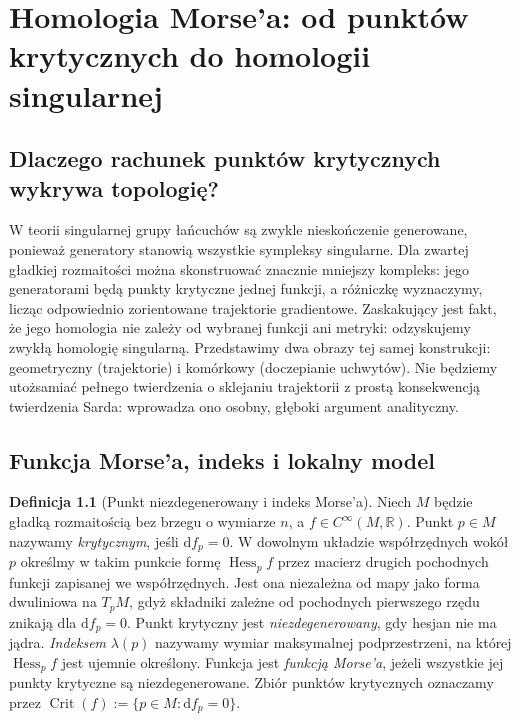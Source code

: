 \documentclass[11pt,a4paper,oneside]{report}
\newcommand{\R}{\mathbb{R}}
\newcommand{\dd}{\mathrm d}
\theoremstyle{plain}
\theoremstyle{definition}
\newtheorem{definicja}[twierdzenie]{Definicja}
\theoremstyle{remark}
\begin{document}

\chapter{Homologia Morse'a: od punktów krytycznych do homologii singularnej}
\label{ch:morse-v10}

\section{Dlaczego rachunek punktów krytycznych wykrywa topologię?}
W teorii singularnej grupy łańcuchów są zwykle nieskończenie generowane,
ponieważ generatory stanowią wszystkie sympleksy singularne. Dla zwartej
gładkiej rozmaitości można skonstruować znacznie mniejszy kompleks:
jego generatorami będą punkty krytyczne jednej funkcji, a różniczkę
wyznaczymy, licząc odpowiednio zorientowane trajektorie gradientowe.
Zaskakujący jest fakt, że jego homologia nie zależy od wybranej
funkcji ani metryki: odzyskujemy zwykłą homologię singularną.
Przedstawimy dwa obrazy tej samej konstrukcji: geometryczny (trajektorie)
i komórkowy (doczepianie uchwytów). Nie będziemy utożsamiać pełnego
twierdzenia o sklejaniu trajektorii z prostą konsekwencją twierdzenia
Sarda: wprowadza ono osobny, głęboki argument analityczny.

\section{Funkcja Morse'a, indeks i lokalny model}
\begin{definicja}[Punkt niezdegenerowany i indeks Morse'a]
Niech $M$ będzie gładką rozmaitością bez brzegu o wymiarze $n$,
a $f\in C^\infty(M,\R)$. Punkt $p\in M$ nazywamy \emph{krytycznym}, jeśli $\dd f_p=0$.
W dowolnym układzie współrzędnych wokół $p$ określmy w takim
punkcie formę $\operatorname{Hess}_p f$ przez macierz drugich
pochodnych funkcji zapisanej we współrzędnych.
Jest ona niezależna od mapy jako forma dwuliniowa na $T_pM$, gdyż
składniki zależne od pochodnych pierwszego rzędu znikają dla $\dd f_p=0$.
Punkt krytyczny jest \emph{niezdegenerowany}, gdy hesjan nie ma jądra.
\emph{Indeksem} $\lambda(p)$ nazywamy wymiar maksymalnej podprzestrzeni,
na której $\operatorname{Hess}_pf$ jest ujemnie określony.
Funkcja jest \emph{funkcją Morse'a}, jeżeli wszystkie jej punkty
krytyczne są niezdegenerowane.
Zbiór punktów krytycznych oznaczamy przez
$\operatorname{Crit}(f):=\{p\in M:\dd f_p=0\}$.
\end{definicja}
\end{document}
